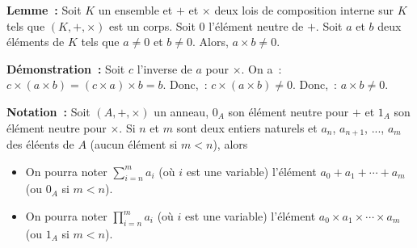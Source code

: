 \medskip

\noindent\textbf{Lemme :} Soit $K$ un ensemble et $+$ et $\times$ deux lois de composition interne sur $K$ tels que $(K, +, \times)$ est un corps. 
    Soit $0$ l'élément neutre de $+$.
    Soit $a$ et $b$ deux éléments de $K$ tels que $a \neq 0$ et $b \neq 0$.
    Alors, $a \times b \neq 0$.

\medskip

\noindent\textbf{Démonstration :} Soit $c$ l'inverse de $a$ pour $\times$.
    On a : $c \times (a \times b) = (c \times a) \times b = b$.
    Donc, : $c \times (a \times b) \neq 0$.
    Donc, : $a \times b \neq 0$.

    \done

\medskip

\noindent\textbf{Notation :} Soit $(A, +, \times)$ un anneau, $0_A$ son élément neutre pour $+$ et $1_A$ son élément neutre pour $\times$.
    Si $n$ et $m$ sont deux entiers naturels et $a_n$, $a_{n+1}$, ..., $a_m$ des éléents de $A$ (aucun élément si $m < n$), alors 
    \begin{itemize}[nosep]
        \item On pourra noter $\sum_{i=n}^m a_i$ (où $i$ est une variable) l'élément $a_0 + a_1 + \cdots + a_m$ (ou $0_A$ si $m < n$).
        \item On pourra noter $\prod_{i=n}^m a_i$ (où $i$ est une variable) l'élément $a_0 \times a_1 \times \cdots \times a_m$ (ou $1_A$ si $m < n$).
    \end{itemize}
